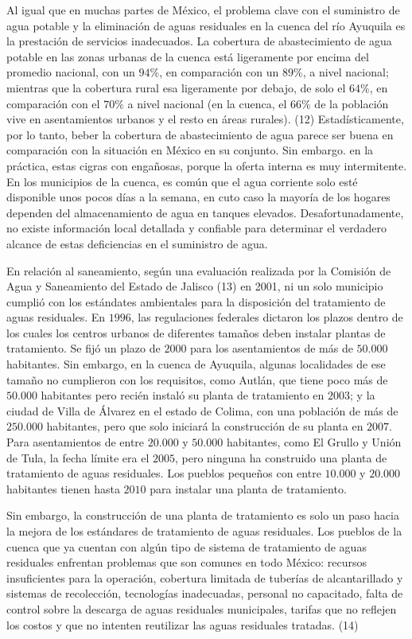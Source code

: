     Al igual que en muchas partes de México, el problema clave con el suministro de agua potable y la eliminación de aguas residuales en la cuenca del río Ayuquila es la prestación de servicios inadecuados. La cobertura de abastecimiento de agua potable en las zonas urbanas de la cuenca está ligeramente por encima del promedio nacional, con un $94\%$, en comparación con un $89\%$, a nivel nacional; mientras que la cobertura rural esa ligeramente por debajo, de solo el $64\%$, en comparación con el $70\%$ a nivel nacional (en la cuenca, el $66\%$ de la población vive en asentamientos urbanos y el resto en áreas rurales). (12) Estadísticamente, por lo tanto, beber la cobertura de abastecimiento de agua parece ser buena en comparación con la situación en México en su conjunto. Sin embargo. en la práctica, estas cigras con engañosas, porque la oferta interna es muy intermitente. En los municipios de la cuenca, es común que el agua corriente solo esté disponible unos pocos días a la semana, en cuto caso la mayoría de los hogares dependen del almacenamiento de agua en tanques elevados. Desafortunadamente, no existe información local detallada y confiable para determinar el verdadero alcance de estas deficiencias en el suministro de agua.

    En relación al saneamiento, según una evaluación realizada por la Comisión de Agua y Saneamiento del Estado de Jalisco (13) en 2001, ni un solo municipio cumplió con los estándates ambientales para la disposición del tratamiento de aguas residuales. En $1996$, las regulaciones federales dictaron los plazos dentro de los cuales los centros urbanos de diferentes tamaños deben instalar plantas de tratamiento. Se fijó un plazo de $2000$ para los asentamientos de más de $50.000$ habitantes. Sin embargo, en la cuenca de Ayuquila, algunas localidades de ese tamaño no cumplieron con los requisitos, como Autlán, que tiene poco más de $50.000$ habitantes pero recién instaló su planta de tratamiento en $2003$; y la ciudad de Villa de Álvarez en el estado de Colima, con una población de más de $250.000$ habitantes, pero que solo iniciará la construcción de su planta en $2007$. Para asentamientos de entre $20.000$ y $50.000$ habitantes, como El Grullo y Unión de Tula, la fecha límite era el $2005$, pero ninguna ha construido una planta de tratamiento de aguas residuales. Los pueblos pequeños con entre $10.000$ y $20.000$ habitantes tienen hasta $2010$ para instalar una planta de tratamiento.

    Sin embargo, la construcción de una planta de tratamiento es solo un paso hacia la mejora de los estándares de tratamiento de aguas residuales. Los pueblos de la cuenca que ya cuentan con algún tipo de sistema de tratamiento de aguas residuales enfrentan problemas que son comunes en todo México: recursos insuficientes para la operación, cobertura limitada de tuberías de alcantarillado y sistemas de recolección, tecnologías inadecuadas, personal no capacitado, falta de control sobre la descarga de aguas residuales municipales, tarifas que no reflejen los costos y que no intenten reutilizar las aguas residuales tratadas. (14)

